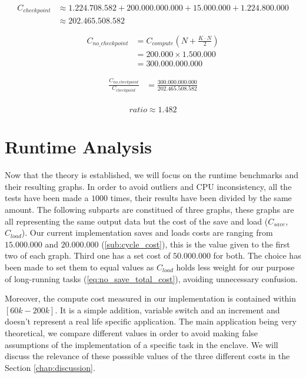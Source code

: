 \documentclass[11pt,a4paper]{report}
\begin{document}
\begin{align*}
C_{checkpoint} &\approx 1.224.708.582 + 200.000.000.000 + 15.000.000 + 1.224.800.000 \\
&\approx 202.465.508.582
\end{align*}

\begin{align*}
C_{no\_checkpoint} &= C_{compute}\left(N + \frac{K\cdot N}{2}\right) \\
&= 200.000 \times 1.500.000 \\
&= 300.000.000.000
\end{align*}

\begin{align*}
\frac{C_{no\_checkpoint}}{C_{checkpoint}} &= \frac{300.000.000.000}{202.465.508.582} \\
\end{align*} 

\begin{equation}
\boxed{ratio \approx 1.482}
\end{equation}


\section{Runtime Analysis}
\label{sec:rt_analysis}
Now that the theory is established, we will focus on the runtime benchmarks and their resulting graphs.
In order to avoid outliers and CPU inconsistency, all the tests have been made a $1000$ times, their results have been divided by the same amount.
The following subparts are constitued of three graphs, these graphs are all representing the same output data but the cost of the save and load ($C_{save}$, $C_{load}$).
Our current implementation saves and loads costs are ranging from $15.000.000$ and $20.000.000$ (\ref{sub:cycle_cost}), this is the value given to the first two of each graph.
Third one has a set cost of $50.000.000$ for both.
The choice has been made to set them to equal values as $C_{load}$ holds less weight for our purpose of long-running tasks (\ref{eq:no_save_total_cost}), avoiding unnecessary confusion.

Moreover, the compute cost measured in our implementation is contained within $[60k-200k]$. 
It is a simple addition, variable switch and an increment and doesn't represent a real life specific application.
The main application being very theoretical, we compare different values in order to avoid making false assumptions of the implementation of a specific task in the enclave.
We will discuss the relevance of these posssible values of the three different costs in the Section \ref{chap:discussion}.
\end{document}

